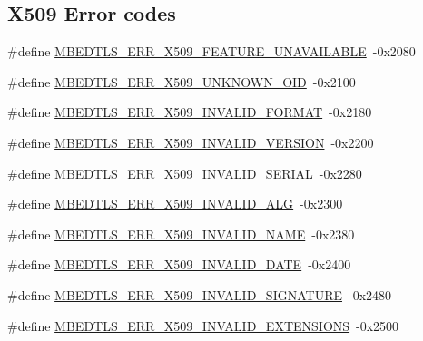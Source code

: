 \subsection*{X509 Error codes}
\begin{DoxyCompactItemize}
\item 
\#define \mbox{\hyperlink{group__x509__module_ga185bc7f27a2b1f7742537a2377c52ee3}{M\+B\+E\+D\+T\+L\+S\+\_\+\+E\+R\+R\+\_\+\+X509\+\_\+\+F\+E\+A\+T\+U\+R\+E\+\_\+\+U\+N\+A\+V\+A\+I\+L\+A\+B\+LE}}~-\/0x2080
\item 
\#define \mbox{\hyperlink{group__x509__module_gab4e8e2e41bfe62e969343efaa2784103}{M\+B\+E\+D\+T\+L\+S\+\_\+\+E\+R\+R\+\_\+\+X509\+\_\+\+U\+N\+K\+N\+O\+W\+N\+\_\+\+O\+ID}}~-\/0x2100
\item 
\#define \mbox{\hyperlink{group__x509__module_ga45b8366804b7e2cbf3e25011f054802c}{M\+B\+E\+D\+T\+L\+S\+\_\+\+E\+R\+R\+\_\+\+X509\+\_\+\+I\+N\+V\+A\+L\+I\+D\+\_\+\+F\+O\+R\+M\+AT}}~-\/0x2180
\item 
\#define \mbox{\hyperlink{group__x509__module_ga527608dc04b2c831fe5b161ec26aab76}{M\+B\+E\+D\+T\+L\+S\+\_\+\+E\+R\+R\+\_\+\+X509\+\_\+\+I\+N\+V\+A\+L\+I\+D\+\_\+\+V\+E\+R\+S\+I\+ON}}~-\/0x2200
\item 
\#define \mbox{\hyperlink{group__x509__module_ga8124a68edabf35ed9323880584128f16}{M\+B\+E\+D\+T\+L\+S\+\_\+\+E\+R\+R\+\_\+\+X509\+\_\+\+I\+N\+V\+A\+L\+I\+D\+\_\+\+S\+E\+R\+I\+AL}}~-\/0x2280
\item 
\#define \mbox{\hyperlink{group__x509__module_gae16cddbd42e08f6dd093cf4326e59413}{M\+B\+E\+D\+T\+L\+S\+\_\+\+E\+R\+R\+\_\+\+X509\+\_\+\+I\+N\+V\+A\+L\+I\+D\+\_\+\+A\+LG}}~-\/0x2300
\item 
\#define \mbox{\hyperlink{group__x509__module_ga8f61c2f303bf065af4f783e03f952ede}{M\+B\+E\+D\+T\+L\+S\+\_\+\+E\+R\+R\+\_\+\+X509\+\_\+\+I\+N\+V\+A\+L\+I\+D\+\_\+\+N\+A\+ME}}~-\/0x2380
\item 
\#define \mbox{\hyperlink{group__x509__module_gac36bf085ce8f7f57f039bda8828bd824}{M\+B\+E\+D\+T\+L\+S\+\_\+\+E\+R\+R\+\_\+\+X509\+\_\+\+I\+N\+V\+A\+L\+I\+D\+\_\+\+D\+A\+TE}}~-\/0x2400
\item 
\#define \mbox{\hyperlink{group__x509__module_ga022c175386f082b4e056e6268ee68cab}{M\+B\+E\+D\+T\+L\+S\+\_\+\+E\+R\+R\+\_\+\+X509\+\_\+\+I\+N\+V\+A\+L\+I\+D\+\_\+\+S\+I\+G\+N\+A\+T\+U\+RE}}~-\/0x2480
\item 
\#define \mbox{\hyperlink{group__x509__module_gaa0788dbf0325aea4ab566717514b4422}{M\+B\+E\+D\+T\+L\+S\+\_\+\+E\+R\+R\+\_\+\+X509\+\_\+\+I\+N\+V\+A\+L\+I\+D\+\_\+\+E\+X\+T\+E\+N\+S\+I\+O\+NS}}~-\/0x2500

\end{DoxyCompactItemize}
